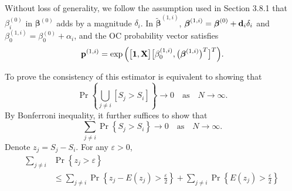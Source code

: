 Without loss of generality, we follow the assumption used in Section 3.8.1 that
$\beta_i^{(0)}$ in $\bm{\beta}^{(0)}$ adds by a magnitude $\delta_i$. In
$\widetilde{\bm{\beta}}^{(1,i)}$, $\boldsymbol{\beta}^{(1,i)}=\boldsymbol{\beta}^{(0)}+{\bf
d}_i\delta_i$ and $\beta_0^{(1,i)}=\beta_0^{(0)}+\alpha_i$, and the OC probability
vector satisfies
\[
{\bf p}^{(1,i)}=\exp\Big(\big[\boldsymbol{1},{\bf X}\big]\big[\beta^{(1,i)}_0,
\big(\boldsymbol{\beta}^{(1,i)}\big)^T\big]^T\Big).
\]

To prove the consistency of this estimator is equivalent to showing that
$$\Pr\left\{\bigcup\limits_{j\neq i}\left[S_j> S_i\right]\right\}\rightarrow 0
\quad {\mathrm{as}} \quad N\rightarrow\infty.$$ By Bonferroni inequality, it further
suffices to show that
$$\sum\limits_{j\neq i}\Pr\left\{S_j> S_i \right\} \rightarrow 0  \quad {\mathrm{as}}
\quad N\rightarrow\infty.$$ Denote $z_j=S_j-S_i$. For any $\varepsilon>0$,
\begin{align}
\sum\limits_{j\neq i}&\Pr\left\{z_j>\varepsilon\right\}\nonumber\\
&\leq \sum\limits_{j\neq
i}\Pr\left\{z_j-E(z_j)>\frac{\varepsilon}{2}\right\}+\sum\limits_{j\neq
i}\Pr\left\{E(z_j)>\frac{\varepsilon}{2}\right\} \label{F3.12}
\end{align}

